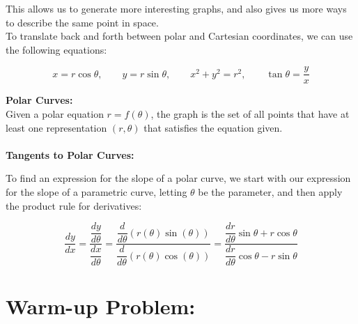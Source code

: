  This allows us to generate more interesting graphs, and also gives us more ways to describe the same point in space.\\


To translate back and forth between polar and Cartesian coordinates, we can use the following equations:

\[x=r \cos\theta, \qquad y=r\sin\theta, \qquad x^2 + y^2 = r^2, \qquad \tan \theta = \frac{y}{x}\]





%
%
%

\textbf{Polar Curves:}\\
Given a polar equation \(r = f(\theta)\), the graph is the set of all points that have at least one representation \((r,\theta)\) that satisfies the equation given.\\~\\

\textbf{Tangents to Polar Curves:}

To find an expression for the slope of a polar curve, we start with our expression for the slope of a parametric curve, letting \(\theta\) be the parameter, and then apply the product rule for derivatives:

\[
\frac{dy}{dx} = \frac{\dfrac{dy}{d\theta}}{\dfrac{dx}{d\theta}} = 
 \frac{\dfrac{d}{d\theta}\left(r(\theta)\sin(\theta)\right)}{\dfrac{d}{d\theta}\left(r(\theta)\cos(\theta)\right)} = 
\frac{\dfrac{dr}{d\theta}\sin\theta + r \cos\theta}{\dfrac{dr}{d\theta}\cos\theta - r\sin\theta}
\]



\section*{Warm-up Problem:}


